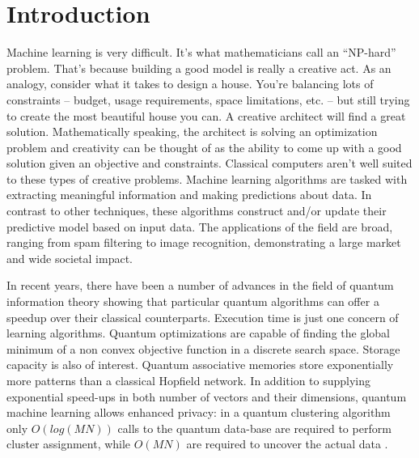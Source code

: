 \chapter{Introduction}\label{ch:introduction}

Machine learning is very difficult. It’s what mathematicians call an “NP-hard” problem. That’s because building a good model is really a creative act. As an analogy, consider what it takes to design a house. You’re balancing lots of constraints -- budget, usage requirements, space limitations, etc. -- but still trying to create the most beautiful house you can. A creative architect will find a great solution. Mathematically speaking, the architect is solving an optimization problem and creativity can be thought of as the ability to come up with a good solution given an objective and constraints. Classical computers aren’t well suited to these types of creative problems. Machine learning algorithms are tasked with extracting meaningful information and making predictions about data. In contrast to other techniques, these algorithms construct and/or update their predictive model based on input data. The applications of the field are broad, ranging from spam filtering to image recognition, demonstrating a large market and wide societal impact.\par\bigskip
In recent years, there have been a number of advances in the field of quantum information theory showing that particular quantum algorithms can offer a speedup over their classical counterparts. Execution time is just one concern of learning algorithms. Quantum optimizations are capable of finding the global minimum of a non convex objective function in a discrete search space. Storage capacity is also of interest. Quantum associative memories store exponentially more patterns than a classical Hopfield network. In addition to supplying exponential speed-ups in both number of vectors and their dimensions, quantum machine learning allows enhanced privacy: in a quantum clustering algorithm only $O(log(MN))$ calls to the quantum data-base are required to perform cluster assignment, while $O(MN)$ are required to uncover the actual data \cite{kmeans}.\par\bigskip
